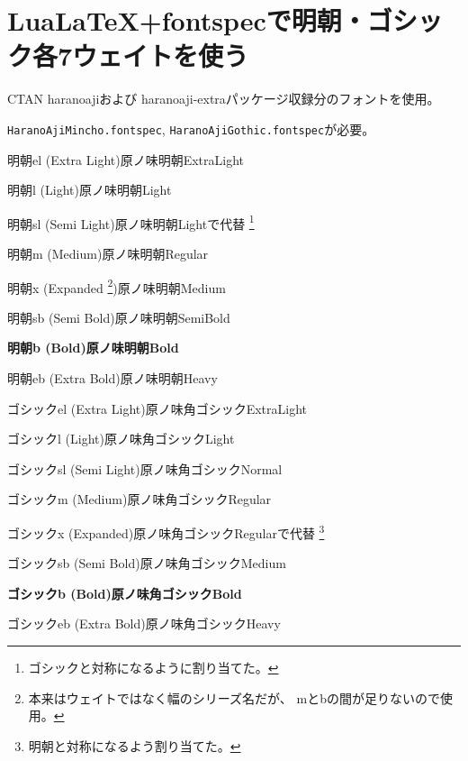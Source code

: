 \documentclass{ltjsarticle}
\begin{document}
\section{Lua\LaTeX +fontspecで明朝・ゴシック各7ウェイトを使う}

CTAN haranoajiおよび
haranoaji-extraパッケージ収録分のフォントを使用。

\texttt{HaranoAjiMincho.fontspec},
\texttt{HaranoAjiGothic.fontspec}が必要。

\vspace{\baselineskip}

\rmfamily
\mcfamily
{}\selectfont
明朝el (Extra Light)原ノ味明朝ExtraLight

\selectfont
明朝l (Light)原ノ味明朝Light

\selectfont
明朝sl (Semi Light)原ノ味明朝Lightで代替
\footnote{ゴシックと対称になるように割り当てた。}

\mdseries
明朝m (Medium)原ノ味明朝Regular

\selectfont
明朝x (Expanded%
\footnote{本来はウェイトではなく幅のシリーズ名だが、
  mとbの間が足りないので使用。})原ノ味明朝Medium

\selectfont
明朝sb (Semi Bold)原ノ味明朝SemiBold

\bfseries
明朝b (Bold)原ノ味明朝Bold

\selectfont
明朝eb (Extra Bold)原ノ味明朝Heavy

\sffamily
\gtfamily
{}\selectfont
ゴシックel (Extra Light)原ノ味角ゴシックExtraLight

\selectfont
ゴシックl (Light)原ノ味角ゴシックLight

\selectfont
ゴシックsl (Semi Light)原ノ味角ゴシックNormal

\mdseries
ゴシックm (Medium)原ノ味角ゴシックRegular

\selectfont
ゴシックx (Expanded)原ノ味角ゴシックRegularで代替
\footnote{明朝と対称になるよう割り当てた。}

\selectfont
ゴシックsb (Semi Bold)原ノ味角ゴシックMedium

\bfseries
ゴシックb (Bold)原ノ味角ゴシックBold

\selectfont
ゴシックeb (Extra Bold)原ノ味角ゴシックHeavy
\end{document}
